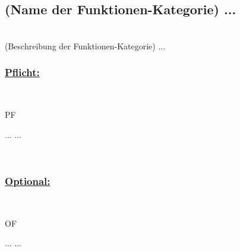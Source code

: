 %
%


\subsection{(Name der Funktionen-Kategorie) ...}

~\\
(Beschreibung der Funktionen-Kategorie) ...
\\

%
%
\subsubsection*{\underline{Pflicht:}}~\\

\begin{reqs}{PF}

	\req[ 1] ...
 	\req[10] ...
	
\end{reqs}

~\\


%
%
\subsubsection*{\underline{Optional:}}~\\


\begin{reqs}{OF}

	\req[ 11] ...
 	\req[100] ...
	
\end{reqs}

~\\